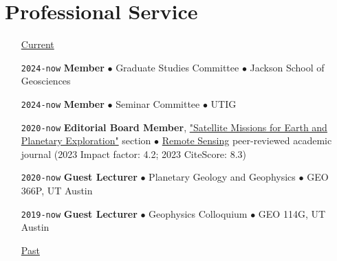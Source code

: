 \section*{Professional Service}

\begin{itemize}[leftmargin=5.8em, labelsep=1.5em]
    \setlength\itemsep{-.5em}

    \item[\ul{Current}] 

    \item[\texttt{2024-now}] \textbf{Member} $\bullet$ Graduate Studies Committee $\bullet$ Jackson School of Geosciences
    
    \item[\texttt{2024-now}] \textbf{Member} $\bullet$ Seminar Committee $\bullet$ UTIG
    
    \item[\texttt{2020-now}] \textbf{Editorial Board Member}, \href{https://www.mdpi.com/journal/remotesensing/sectioneditors/satellite_missions}{"Satellite Missions for Earth and Planetary Exploration"} section $\bullet$ \href{https://www.mdpi.com/journal/remotesensing}{Remote Sensing} peer-reviewed academic journal (2023 Impact factor: 4.2; 2023 CiteScore: 8.3)
    
    \item[\texttt{2020-now}] \textbf{Guest Lecturer} $\bullet$ Planetary Geology and Geophysics $\bullet$  GEO 366P, UT Austin
    
    \item[\texttt{2019-now}] \textbf{Guest Lecturer} $\bullet$ Geophysics Colloquium $\bullet$  GEO 114G, UT Austin

    \vspace{.5em}
    \item[\ul{Past}] 
    \vspace{.5em}
    

\end{itemize}
